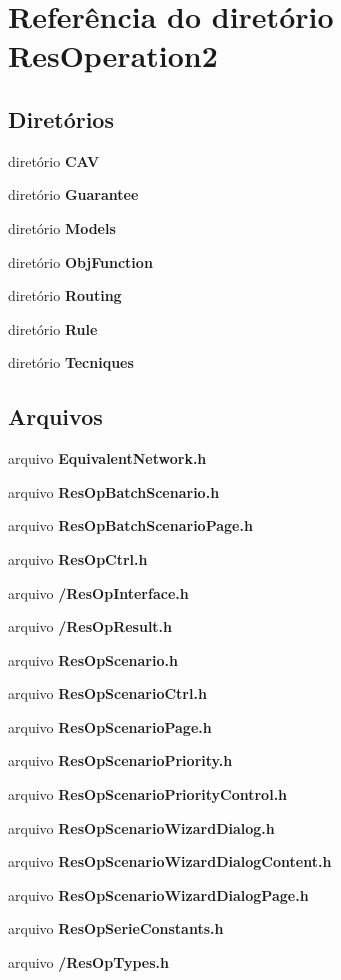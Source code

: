 \section{Referência do diretório Res\+Operation2}
\label{dir_8dacbb830ed2ec57eb1132a8477e41cd}
\subsection*{Diretórios}
\begin{DoxyCompactItemize}
\item 
diretório {\bf C\+AV}
\item 
diretório {\bf Guarantee}
\item 
diretório {\bf Models}
\item 
diretório {\bf Obj\+Function}
\item 
diretório {\bf Routing}
\item 
diretório {\bf Rule}
\item 
diretório {\bf Tecniques}
\end{DoxyCompactItemize}
\subsection*{Arquivos}
\begin{DoxyCompactItemize}
\item 
arquivo {\bf Equivalent\+Network.\+h}
\item 
arquivo {\bf Res\+Op\+Batch\+Scenario.\+h}
\item 
arquivo {\bf Res\+Op\+Batch\+Scenario\+Page.\+h}
\item 
arquivo {\bf Res\+Op\+Ctrl.\+h}
\item 
arquivo {\bf /\+Res\+Op\+Interface.\+h}
\item 
arquivo {\bf /\+Res\+Op\+Result.\+h}
\item 
arquivo {\bf Res\+Op\+Scenario.\+h}
\item 
arquivo {\bf Res\+Op\+Scenario\+Ctrl.\+h}
\item 
arquivo {\bf Res\+Op\+Scenario\+Page.\+h}
\item 
arquivo {\bf Res\+Op\+Scenario\+Priority.\+h}
\item 
arquivo {\bf Res\+Op\+Scenario\+Priority\+Control.\+h}
\item 
arquivo {\bf Res\+Op\+Scenario\+Wizard\+Dialog.\+h}
\item 
arquivo {\bf Res\+Op\+Scenario\+Wizard\+Dialog\+Content.\+h}
\item 
arquivo {\bf Res\+Op\+Scenario\+Wizard\+Dialog\+Page.\+h}
\item 
arquivo {\bf Res\+Op\+Serie\+Constants.\+h}
\item 
arquivo {\bf /\+Res\+Op\+Types.\+h}
\end{DoxyCompactItemize}
